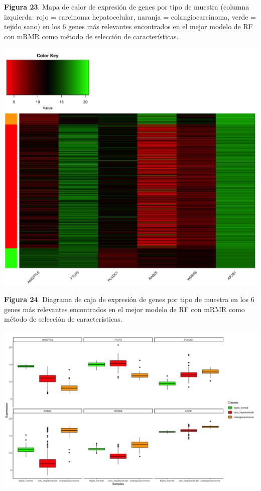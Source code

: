 \begin{center}
\textbf{Figura 23}. Mapa de calor de expresión de genes por tipo de muestra (columna izquierda: rojo = carcinoma hepatocelular, naranja = colangiocarcinoma, verde = tejido sano) en los 6 genes más relevantes encontrados en el mejor modelo de RF con mRMR como método de selección de características.
\end{center}
\begin{center}
	\includegraphics[width=1\textwidth]{figuras/23_higado_multiclase_23_rf_heatmap_mejor_metodo.png} 
\end{center}

\newpage
\begin{center}
\textbf{Figura 24}. Diagrama de caja de expresión de genes por tipo de muestra en los 6 genes más relevantes encontrados en el mejor modelo de RF con mRMR como método de selección de características.
\end{center}
\begin{center}
	\includegraphics[width=1\textwidth]{figuras/24_higado_multiclase_24_rf_boxplots_mejor_metodo.png} 
\end{center}

